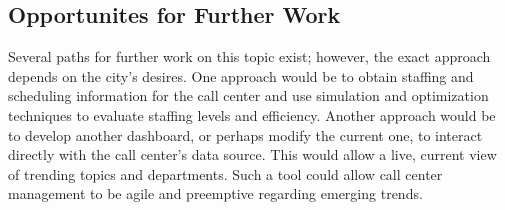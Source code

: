 \documentclass[11pt,twocolumn]{article}
\begin{document}
\subsection{Opportunites for Further Work}

Several paths for further work on this topic exist; however, the exact approach depends on the city's desires.  One approach would be to obtain staffing and scheduling information for the call center and use simulation and optimization techniques to evaluate staffing levels and efficiency.  Another approach would be to develop another dashboard, or perhaps modify the current one, to interact directly with the call center's data source.  This would allow a live, current view of trending topics and departments.  Such a tool could allow call center management to be agile and preemptive regarding emerging trends.


\end{document}
